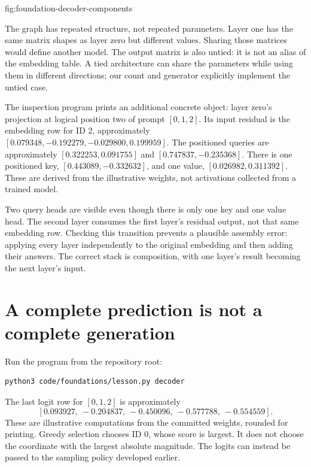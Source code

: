 {fig:foundation-decoder-components}

The graph has repeated structure, not repeated parameters. Layer one
has the same matrix shapes as layer zero but different values.
Sharing those matrices would define another model. The output matrix
is also untied: it is not an alias of the embedding table. A tied
architecture can share the parameters while using them in different
directions; our count and generator explicitly implement the untied case.

The inspection program prints an additional concrete object: layer zero's
projection at logical position two of prompt $[0,1,2]$. Its input residual
is the embedding row for ID 2, approximately
$[0.079348,-0.192279,-0.029800,0.199959]$. The positioned queries are
approximately $[0.322253,0.091755]$ and $[0.747837,-0.235368]$.
There is one positioned key, $[0.443089,-0.332632]$, and one value,
$[0.026982,0.311392]$. These are derived from the illustrative weights,
not activations collected from a trained model.

Two query heads are visible even though there is only one key and one
value head. The second layer consumes the first layer's residual output,
not that same embedding row. Checking this transition prevents a plausible
assembly error: applying every layer independently to the original
embedding and then adding their answers. The correct stack is composition,
with one layer's result becoming the next layer's input.

\section{A complete prediction is not a complete generation}
Run the program from the repository root:
\begin{verbatim}
python3 code/foundations/lesson.py decoder
\end{verbatim}
The last logit row for $[0,1,2]$ is approximately
\[
 [0.093927,\ -0.204837,\ -0.450096,\ -0.577788,\ -0.554559].
\]
These are illustrative computations from the committed weights, rounded
for printing. Greedy selection chooses ID 0, whose score is largest.
It does not choose the coordinate with the largest absolute magnitude.
The logits can instead be passed to the sampling policy developed earlier.


